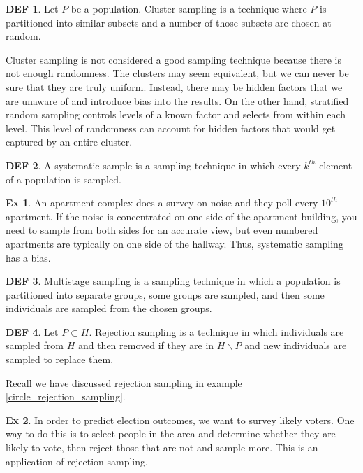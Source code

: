 \documentclass{article}
\theoremstyle{definition}\newtheorem{definition}{DEF}
\theoremstyle{definition}\newtheorem{example}{Ex}
\theoremstyle{lemma}\newtheorem{lemma}{Lemma}
\theoremstyle{corrolary}\newtheorem{corrolary}{Cor}
\begin{document}
\begin{definition}
Let $P$ be a population.
Cluster sampling is a technique where $P$ is partitioned into similar subsets and a number of those subsets are chosen at random.
\end{definition}

Cluster sampling is not considered a good sampling technique because there is not enough randomness.
The clusters may seem equivalent, but we can never be sure that they are truly uniform.
Instead, there may be hidden factors that we are unaware of and introduce bias into the results.
On the other hand, stratified random sampling controls levels of a known factor and selects from within each level.
This level of randomness can account for hidden factors that would get captured by an entire cluster.

\begin{definition}
A systematic sample is a sampling technique in which every $k^{th}$ element of a population is sampled.
\end{definition}

\begin{example}
An apartment complex does a survey on noise and they poll every $10^{th}$ apartment.
If the noise is concentrated on one side of the apartment building, you need to sample from both sides for an accurate view, but even numbered apartments are typically on one side of the hallway.
Thus, systematic sampling has a bias.
\end{example}

\begin{definition}
Multistage sampling is a sampling technique in which a population is partitioned into separate groups, some groups are sampled, and then some individuals are sampled from the chosen groups.
\end{definition}

\begin{definition}
Let $P\subset H$.
Rejection sampling is a technique in which individuals are sampled from $H$ and then removed if they are in $H\backslash P$ and new individuals are sampled to replace them.
\end{definition}

Recall we have discussed rejection sampling in example \ref{circle_rejection_sampling}.

\begin{example}
In order to predict election outcomes, we want to survey likely voters.
One way to do this is to select people in the area and determine whether they are likely to vote, then reject those that are not and sample more.
This is an application of rejection sampling.
\end{example}
\end{document}
